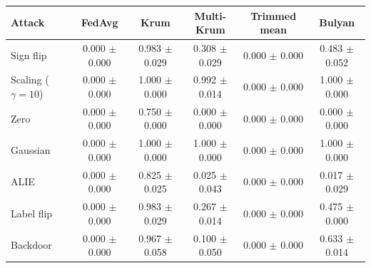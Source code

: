 \begin{tabular}{lccccc}
\toprule
Attack & FedAvg & Krum & Multi-Krum & Trimmed mean & Bulyan \\
\midrule
Sign flip & 0.000 $\pm$ 0.000 & 0.983 $\pm$ 0.029 & 0.308 $\pm$ 0.029 & 0.000 $\pm$ 0.000 & 0.483 $\pm$ 0.052 \\
Scaling ($\gamma=10$) & 0.000 $\pm$ 0.000 & 1.000 $\pm$ 0.000 & 0.992 $\pm$ 0.014 & 0.000 $\pm$ 0.000 & 1.000 $\pm$ 0.000 \\
Zero & 0.000 $\pm$ 0.000 & 0.750 $\pm$ 0.000 & 0.000 $\pm$ 0.000 & 0.000 $\pm$ 0.000 & 0.000 $\pm$ 0.000 \\
Gaussian & 0.000 $\pm$ 0.000 & 1.000 $\pm$ 0.000 & 1.000 $\pm$ 0.000 & 0.000 $\pm$ 0.000 & 1.000 $\pm$ 0.000 \\
ALIE & 0.000 $\pm$ 0.000 & 0.825 $\pm$ 0.025 & 0.025 $\pm$ 0.043 & 0.000 $\pm$ 0.000 & 0.017 $\pm$ 0.029 \\
Label flip & 0.000 $\pm$ 0.000 & 0.983 $\pm$ 0.029 & 0.267 $\pm$ 0.014 & 0.000 $\pm$ 0.000 & 0.475 $\pm$ 0.000 \\
Backdoor & 0.000 $\pm$ 0.000 & 0.967 $\pm$ 0.058 & 0.100 $\pm$ 0.050 & 0.000 $\pm$ 0.000 & 0.633 $\pm$ 0.014 \\
\bottomrule
\end{tabular}
